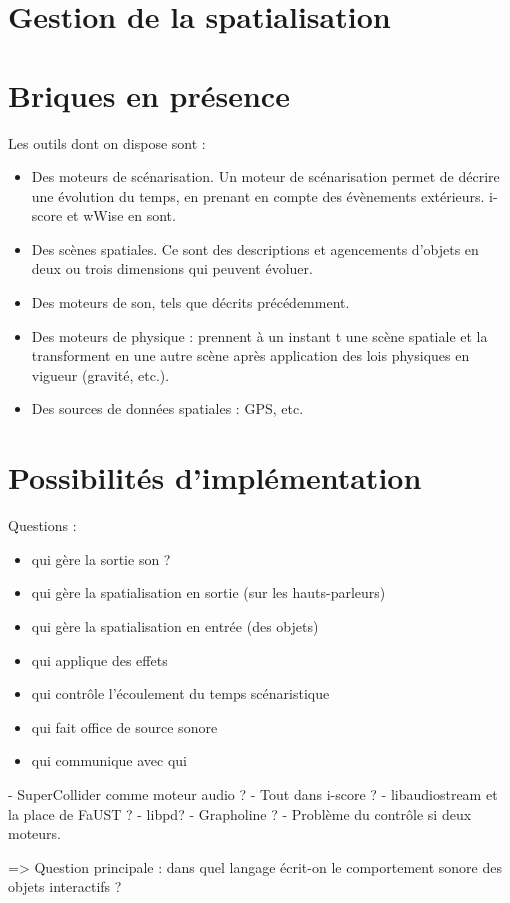 \documentclass[french,12pt,a4paper]{article}
\begin{document}
\section{Gestion de la spatialisation}

\section{Briques en présence}
Les outils dont on dispose sont : 
\begin{itemize}
    \item Des moteurs de scénarisation. Un moteur de scénarisation permet de décrire une évolution du temps, 
    en prenant en compte des évènements extérieurs. 
    i-score et wWise en sont.
    \item Des scènes spatiales. 
    Ce sont des descriptions et agencements d'objets en deux ou trois dimensions qui peuvent évoluer.
    \item Des moteurs de son, tels que décrits précédemment.
    \item Des moteurs de physique : prennent à un instant t une scène spatiale et la transforment en une autre scène après application des lois physiques en vigueur (gravité, etc.).
    \item Des sources de données spatiales : GPS, etc.
\end{itemize}

\section{Possibilités d'implémentation}
Questions : 
\begin{itemize}
\item qui gère la sortie son ?
\item qui gère la spatialisation en sortie (sur les hauts-parleurs)
\item qui gère la spatialisation en entrée (des objets)
\item qui applique des effets
\item qui contrôle l'écoulement du temps scénaristique
\item qui fait office de source sonore
\item qui communique avec qui
\end{itemize}
- SuperCollider comme moteur audio ?
- Tout dans i-score ? 
- libaudiostream et la place de FaUST ?
- libpd?
- Grapholine ?
- Problème du contrôle si deux moteurs.

=> Question principale : dans quel langage écrit-on le comportement 
sonore des objets interactifs ?
\end{document}

